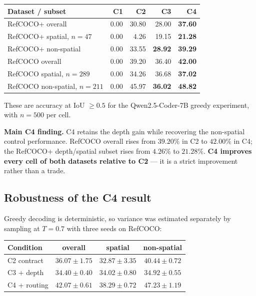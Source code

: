 \documentclass[11pt,a4paper]{article}
\newcommand{\up}[1]{\textcolor{good}{\textbf{#1}}}
\newcommand{\down}[1]{\textcolor{bad}{\textbf{#1}}}
\begin{document}
\begin{center}
\begin{tabular}{@{}lrrrr@{}}
\toprule
\textbf{Dataset / subset} & \textbf{C1} & \textbf{C2} & \textbf{C3} & \textbf{C4} \\
\midrule
RefCOCO+ overall              & 0.00 & 30.80 & 28.00 & \up{37.60} \\
RefCOCO+ spatial, $n = 47$    & 0.00 & 4.26  & 19.15 & \up{21.28} \\
RefCOCO+ non-spatial          & 0.00 & 33.55 & \down{28.92} & \up{39.29} \\
\midrule
RefCOCO overall               & 0.00 & 39.20 & 36.40 & \up{42.00} \\
RefCOCO spatial, $n = 289$    & 0.00 & 34.26 & 36.68 & \up{37.02} \\
RefCOCO non-spatial, $n = 211$& 0.00 & 45.97 & \down{36.02} & \up{48.82} \\
\bottomrule
\end{tabular}
\end{center}

These are accuracy at IoU $\geq 0.5$ for the Qwen2.5-Coder-7B greedy experiment, with
$n = 500$ per cell.

\begin{finding}
\textbf{Main C4 finding.} C4 retains the depth gain while recovering the non-spatial
control performance. RefCOCO overall rises from $39.20\%$ in C2 to $42.00\%$ in C4;
the RefCOCO+ depth/spatial subset rises from $4.26\%$ to $21.28\%$. \textbf{C4 improves
every cell of both datasets relative to C2} --- it is a strict improvement rather than
a trade.
\end{finding}

\subsection{Robustness of the C4 result}

Greedy decoding is deterministic, so variance was estimated separately by sampling at
$T = 0.7$ with three seeds on RefCOCO:

\begin{center}
\begin{tabular}{@{}lccc@{}}
\toprule
\textbf{Condition} & \textbf{overall} & \textbf{spatial} & \textbf{non-spatial} \\
\midrule
C2 contract   & $36.07 \pm 1.75$ & $32.87 \pm 3.35$ & $40.44 \pm 0.72$ \\
C3 + depth    & $34.40 \pm 0.40$ & $34.02 \pm 0.80$ & $34.92 \pm 0.55$ \\
C4 + routing  & $\mathbf{42.07 \pm 0.61}$ & $38.29 \pm 0.72$ & $47.23 \pm 1.19$ \\
\bottomrule
\end{tabular}
\end{center}
\end{document}
